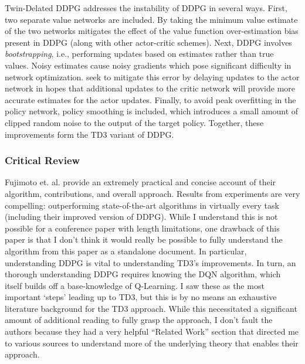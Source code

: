 \documentclass{article}
\begin{document}
Twin-Delated DDPG addresses the instability of DDPG in several ways. First, two separate value networks are included. By taking the minimum value estimate of the two networks mitigates the effect of the value function over-estimation bias present in DDPG (along with other actor-critic schemes). Next, DDPG involves \textit{bootstrapping}, i.e., performing updates based on estimates rather than true values. Noisy estimates cause noisy gradients which pose significant difficulty in network optimization. \cite{td3} seek to mitigate this error by delaying updates to the actor network in hopes that additional updates to the critic network will provide more accurate estimates for the actor updates. Finally, to avoid peak overfitting in the policy network, policy smoothing is included, which introduces a small amount of clipped random noise to the output of the target policy. Together, these improvements form the TD3 variant of DDPG.

\subsubsection{Critical Review}

Fujimoto et. al. provide an extremely practical and concise account of their algorithm, contributions, and overall approach. Results from experiments are very compelling: outperforming state-of-the-art algorithms in virtually every task (including their improved version of DDPG). While I understand this is not possible for a conference paper with length limitations, one drawback of this paper is that I don't think it would really be possible to fully understand the algorithm from this paper as a standalone document. In particular, understanding DDPG is vital to understanding TD3's improvements. In turn, an thorough understanding DDPG requires knowing the DQN algorithm, which itself builds off a base-knowledge of Q-Learning. I saw these as the most important `steps' leading up to TD3, but this is by no means an exhaustive literature background for the TD3 approach. While this necessitated a significant amount of additional reading to fully grasp the approach, I don't fault the authors because they had a very helpful ``Related Work'' section that directed me to various sources to understand more of the underlying theory that enables their approach.
\end{document}
